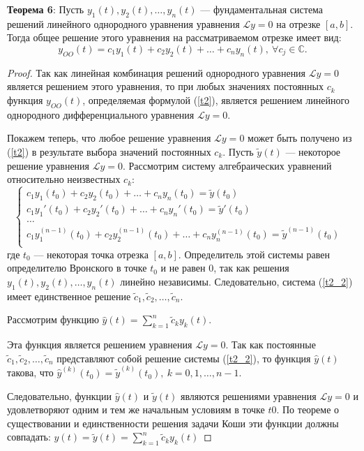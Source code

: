 \textbf{Теорема 6}: Пусть $y_1(t), y_2(t),\dots, y_n(t)$ --- фундаментальная система решений линейного однородного уравнения уравнения $\mathcal{L}y = 0$ на отрезке $[a, b]$. Тогда общее решение этого уравнения на рассматриваемом отрезке имеет вид:
\begin{equation}
    y_{OO}(t) = c_1y_1(t) + c_2y_2(t) +\dots + c_ny_n(t),~\forall c_j \in \mathbb{C}.
    \label{t2}
\end{equation}

\begin{proof}
Так как линейная комбинация решений однородного уравнения $\mathcal{L}y = 0$ является решением этого уравнения, то при любых значениях постоянных $c_k$ функция $y_{OO}(t)$, определяемая формулой (\ref{t2}), является решением линейного однородного дифференциального уравнения $\mathcal{L}y = 0$.

Покажем теперь, что любое решение уравнения $\mathcal{L}y = 0$ может быть получено из (\ref{t2}) в результате выбора значений постоянных $c_k$. Пусть $\tilde{y}(t)$ --- некоторое решение уравнения $\mathcal{L}y = 0$. Рассмотрим систему алгебраических уравнений относительно неизвестных $c_k$:
\begin{equation}
    \begin{cases}
        c_1y_1(t_0) + c_2y_2(t_0) +\dots + c_ny_n(t_0) = \tilde{y}(t_0)&\\
        c_1y_1'(t_0) + c_2y_2'(t_0) +\dots + c_ny_n'(t_0) = \tilde{y}'(t_0)&\\
        \dots&\\
        c_1y_1^{(n-1)}(t_0) + c_2y_2^{(n-1)}(t_0) +\dots + c_ny_n^{(n-1)}(t_0) = \tilde{y}^{(n-1)}(t_0)&\\
    \end{cases}
    \label{t2_2}
\end{equation}
где $t_0$ --- некоторая точка отрезка $[a, b]$. Определитель этой системы равен определителю Вронского в точке $t_0$ и не равен 0, так как решения $y_1(t), y_2(t),\dots , y_n(t)$ линейно независимы. Следовательно, система (\ref{t2_2}) имеет единственное решение $\tilde{c}_1, \tilde{c}_2 ,\dots, \tilde{c}_n$.

Рассмотрим функцию $\hat{y}(t) = \displaystyle\sum_{k=1}^{n}\tilde{c}_ky_k(t).$

Эта функция является решением уравнения $\mathcal{L}y = 0$. Так как постоянные $\tilde{c}_1, \tilde{c}_2 ,\dots, \tilde{c}_n$ представляют собой решение системы (\ref{t2_2}), то функция $\hat{y}(t)$ такова, что $\hat{y}^{(k)}(t_0)=\tilde{y}^{(k)}(t_0),~k=0,1,\dots ,n-1$.

Следовательно, функции $\hat{y}(t)$ и $\tilde{y}(t)$ являются решениями уравнения $\mathcal{L}y = 0$ и удовлетворяют одним и тем же начальным условиям в точке $t0$. По теореме о существовании и единственности решения задачи Коши эти функции должны совпадать: $\hat{y}(t)=\tilde{y}(t)=\displaystyle\sum_{k=1}^{n}\tilde{c}_ky_k(t)$
\end{proof}

